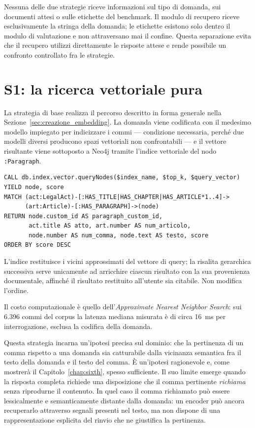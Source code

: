 Nessuna delle due strategie riceve informazioni sul tipo di domanda, sui documenti attesi o sulle etichette del benchmark. Il modulo di recupero riceve esclusivamente la stringa della domanda; le etichette esistono solo dentro il modulo di valutazione e non attraversano mai il confine. Questa separazione evita che il recupero utilizzi direttamente le risposte attese e rende possibile un confronto controllato fra le strategie.

\section{S1: la ricerca vettoriale pura}
\label{sec:ricerca_vettoriale_pura}

La strategia di base realizza il percorso descritto in forma generale nella Sezione~\ref{sec:creazione_embedding}. La domanda viene codificata con il medesimo modello impiegato per indicizzare i commi --- condizione necessaria, perché due modelli diversi producono spazi vettoriali non confrontabili --- e il vettore risultante viene sottoposto a Neo4j tramite l'indice vettoriale del nodo \texttt{:Paragraph}.

\begin{lstlisting}[language=Cypher, caption={Interrogazione dell'indice vettoriale per la ricerca di base}, label={lst:cypher_vector}]
CALL db.index.vector.queryNodes($index_name, $top_k, $query_vector)
YIELD node, score
MATCH (act:LegalAct)-[:HAS_TITLE|HAS_CHAPTER|HAS_ARTICLE*1..4]->
      (art:Article)-[:HAS_PARAGRAPH]->(node)
RETURN node.custom_id AS paragraph_custom_id,
       act.title AS atto, art.number AS num_articolo,
       node.number AS num_comma, node.text AS testo, score
ORDER BY score DESC
\end{lstlisting}

L'indice restituisce i vicini approssimati del vettore di query; la risalita gerarchica successiva serve unicamente ad arricchire ciascun risultato con la sua provenienza documentale, affinché il risultato restituito all'utente sia citabile. Non modifica l'ordine.

Il costo computazionale è quello dell'\textit{Approximate Nearest Neighbor Search}: sui 6.396 commi del corpus la latenza mediana misurata è di circa 16~ms per interrogazione, esclusa la codifica della domanda.

Questa strategia incarna un'ipotesi precisa sul dominio: che la pertinenza di un comma rispetto a una domanda sia catturabile dalla vicinanza semantica fra il testo della domanda e il testo del comma. È un'ipotesi ragionevole e, come mostrerà il Capitolo~\ref{chap:sixth}, spesso sufficiente. Il suo limite emerge quando la risposta completa richiede una disposizione che il comma pertinente \textit{richiama} senza riprodurne il contenuto. In quel caso il comma richiamato può essere lessicalmente e semanticamente distante dalla domanda: un encoder può ancora recuperarlo attraverso segnali presenti nel testo, ma non dispone di una rappresentazione esplicita del rinvio che ne giustifica la pertinenza.

